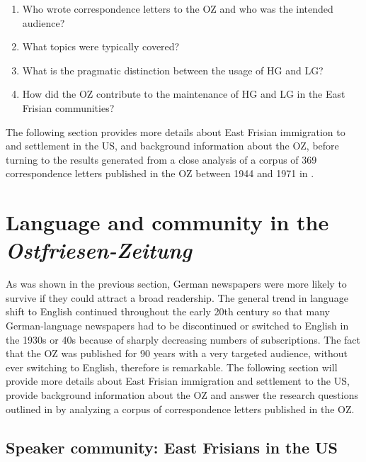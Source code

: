 \documentclass[output=paper]{langsci/langscibook}
\begin{document}
\largerpage
\begin{enumerate}
\item Who wrote correspondence letters to the OZ and who was the intended audience?
 
\item What topics were typically covered?
 
\item What is the pragmatic distinction between the usage of HG and LG?
 
\item How did the OZ contribute to the maintenance of HG and LG in the East Frisian communities? 
%
\end{enumerate}


The following section provides more details about East Frisian immigration to and settlement in the US, and background information about the OZ, before turning to the results generated from a close analysis of a corpus of 369 correspondence letters published in the OZ between 1944 and 1971 in .


\section{Language and community in the \textit{Ostfriesen-Zeitung}}
\label{sec:rocker:3}


As was shown in the previous section, German newspapers were more likely to survive if they could attract a broad readership. The general trend in language shift to English continued throughout the early 20th century so that many German-language newspapers had to be discontinued or switched to English in the 1930s or 40s because of sharply decreasing numbers of subscriptions. The fact that the OZ was published for 90 years with a very targeted audience, without ever switching to English, therefore is remarkable. The following section will provide more details about East Frisian immigration and settlement to the US, provide background information about the OZ and answer the research questions outlined in  by analyzing a corpus of correspondence letters published in the OZ.

\subsection{Speaker community: East Frisians in the US} %
\label{sec:rocker:3.1}
\end{document}
